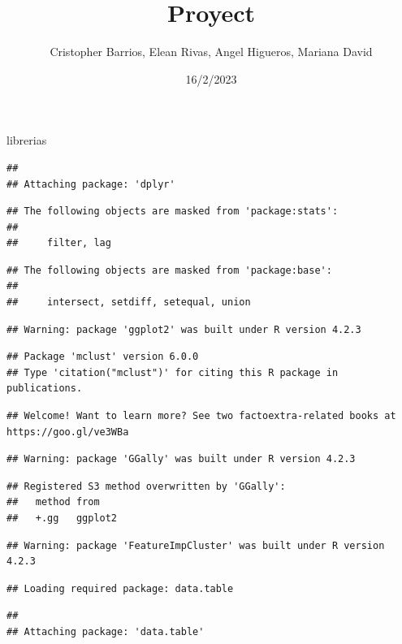 \documentclass[
]{article}
\title{Proyect}
\author{Cristopher Barrios, Elean Rivas, Angel Higueros, Mariana David}
\date{16/2/2023}
\begin{document}
\maketitle

librerias

\begin{verbatim}
## 
## Attaching package: 'dplyr'
\end{verbatim}

\begin{verbatim}
## The following objects are masked from 'package:stats':
## 
##     filter, lag
\end{verbatim}

\begin{verbatim}
## The following objects are masked from 'package:base':
## 
##     intersect, setdiff, setequal, union
\end{verbatim}

\begin{verbatim}
## Warning: package 'ggplot2' was built under R version 4.2.3
\end{verbatim}

\begin{verbatim}
## Package 'mclust' version 6.0.0
## Type 'citation("mclust")' for citing this R package in publications.
\end{verbatim}

\begin{verbatim}
## Welcome! Want to learn more? See two factoextra-related books at https://goo.gl/ve3WBa
\end{verbatim}

\begin{verbatim}
## Warning: package 'GGally' was built under R version 4.2.3
\end{verbatim}

\begin{verbatim}
## Registered S3 method overwritten by 'GGally':
##   method from   
##   +.gg   ggplot2
\end{verbatim}

\begin{verbatim}
## Warning: package 'FeatureImpCluster' was built under R version 4.2.3
\end{verbatim}

\begin{verbatim}
## Loading required package: data.table
\end{verbatim}

\begin{verbatim}
## 
## Attaching package: 'data.table'
\end{verbatim}
\end{document}

